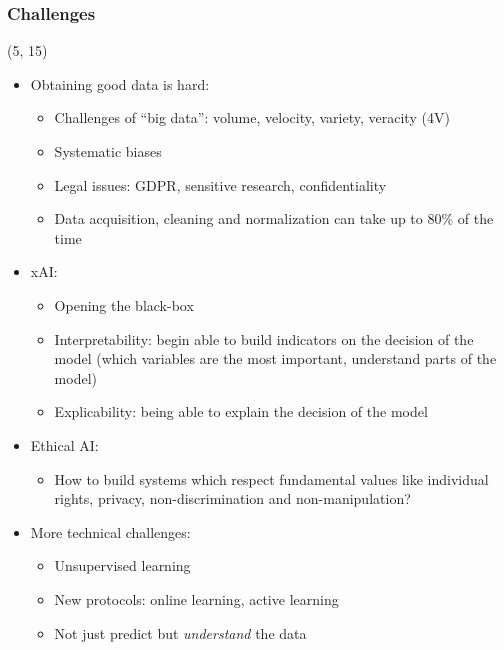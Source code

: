 \begin{frame}
  \frametitle{Challenges}

  \begin{textblock}{90}(5, 15)
    \begin{itemize}
    \item<1-> Obtaining good data is hard:
      \begin{itemize}
      \item Challenges of ``big data'': volume, velocity, variety, veracity (4V)
      \item Systematic biases
      \item Legal issues: GDPR, sensitive research, confidentiality
      \item Data acquisition, cleaning and normalization can take up to 80\% of
        the time
      \end{itemize}
    \item<2-> \acl{xAI}:
      \begin{itemize}
      \item Opening the black-box
      \item Interpretability: begin able to build indicators on the decision of the model
        (which variables are the most important, understand parts of the model)
      \item Explicability: being able to explain the decision of the model
      \end{itemize}
    \item<3-> Ethical \ac{AI}:
      \begin{itemize}
      \item How to build systems which respect fundamental values like individual rights, privacy, non-discrimination and non-manipulation?
      \end{itemize}
    \item<4-> More technical challenges:
      \begin{itemize}
      \item Unsupervised learning
      \item New protocols: online learning, active learning
      \item Not just predict but \emph{understand} the data
      \end{itemize}
    \end{itemize}
  \end{textblock}
\end{frame}
